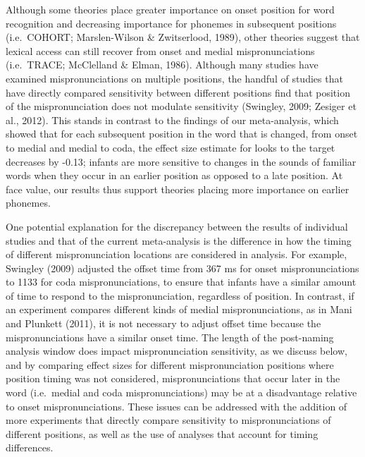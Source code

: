 \documentclass[man]{apa6}
\begin{document}
Although some theories place greater importance on onset position for word recognition and decreasing importance for phonemes in subsequent positions (i.e.~COHORT; Marslen-Wilson \& Zwitserlood, 1989), other theories suggest that lexical access can still recover from onset and medial mispronunciations (i.e.~TRACE; McClelland \& Elman, 1986). Although many studies have examined mispronunciations on multiple positions, the handful of studies that have directly compared sensitivity between different positions find that position of the mispronunciation does not modulate sensitivity (Swingley, 2009; Zesiger et al., 2012). This stands in contrast to the findings of our meta-analysis, which showed that for each subsequent position in the word that is changed, from onset to medial and medial to coda, the effect size estimate for looks to the target decreases by -0.13; infants are more sensitive to changes in the sounds of familiar words when they occur in an earlier position as opposed to a late position. At face value, our results thus support theories placing more importance on earlier phonemes.

One potential explanation for the discrepancy between the results of individual studies and that of the current meta-analysis is the difference in how the timing of different mispronunciation locations are considered in analysis. For example, Swingley (2009) adjusted the offset time from 367 ms for onset mispronunciations to 1133 for coda mispronunciations, to ensure that infants have a similar amount of time to respond to the mispronunciation, regardless of position. In contrast, if an experiment compares different kinds of medial mispronunciations, as in Mani and Plunkett (2011), it is not necessary to adjust offset time because the mispronunciations have a similar onset time. The length of the post-naming analysis window does impact mispronunciation sensitivity, as we discuss below, and by comparing effect sizes for different mispronunciation positions where position timing was not considered, mispronunciations that occur later in the word (i.e.~medial and coda mispronunciations) may be at a disadvantage relative to onset mispronunciations. These issues can be addressed with the addition of more experiments that directly compare sensitivity to mispronunciations of different positions, as well as the use of analyses that account for timing differences.
\end{document}
